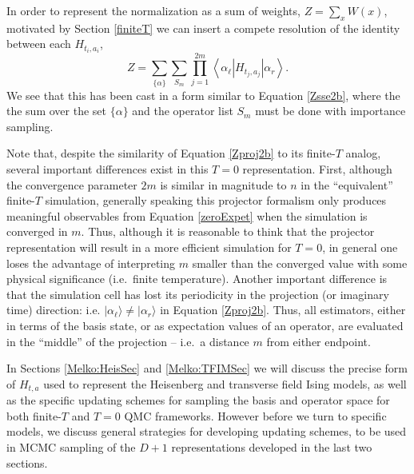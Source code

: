 \documentclass[vecphys]{svmult}
\begin{document}
In order to represent the normalization as a sum of weights, $Z = \sum_x W(x)$, motivated by Section \ref{finiteT} we can insert a compete resolution of the identity between each $H_{t_i,a_i}$,
\begin{equation}
Z=\sum_{ \{ \alpha\} } \sum_{S_m} 
\prod_{j=1}^{2m}   \left\langle{\alpha_{\ell}  \left| H_{t_j,a_j}\right| \alpha_r  }\right\rangle.
 \label{Zproj2b}
\end{equation}
We see that this has been cast in a form similar to Equation \ref{Zsse2b}, where the  the sum over the set $\{ \alpha \}$ and the operator list $S_m$ must be done with importance sampling. 

Note that, despite the similarity of Equation \ref{Zproj2b} to its finite-$T$ analog, several important differences exist in this $T=0$ representation.  First, although the convergence parameter $2m$ is similar in magnitude to $n$ in the ``equivalent'' finite-$T$ simulation, 
generally speaking this projector formalism only produces meaningful observables from Equation \ref{zeroExpet} when the simulation is converged in $m$.  Thus, although it is reasonable to think that the projector representation will result in a more efficient simulation for $T=0$, in general one loses the advantage of interpreting $m$ smaller than the converged value with some physical significance (i.e.~finite temperature).
Another important difference is that the simulation cell has lost its periodicity in the projection (or imaginary time) direction: i.e. $| \alpha_{\ell} \rangle \neq | \alpha_r \rangle$ in Equation \ref{Zproj2b}.  Thus, all estimators, either in terms of the basis state, or as expectation values of an operator, are evaluated in the ``middle'' of the projection -- i.e.~a distance $m$ from either endpoint.

In Sections \ref{Melko:HeisSec} and \ref{Melko:TFIMSec} we will discuss the precise form of $H_{t,a}$ used to represent the Heisenberg and transverse field Ising models, as well as the specific updating schemes for sampling the basis and operator space for both finite-$T$ and $T=0$ QMC frameworks.  However before we turn to specific models, we discuss general strategies for developing updating schemes, to be used in MCMC sampling of the $D+1$ representations developed in the last two sections.
\end{document}
